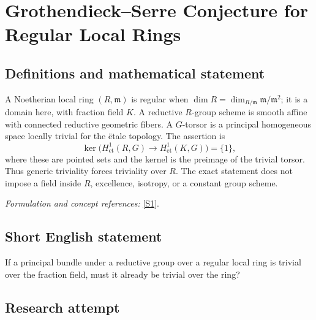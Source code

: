 \documentclass[11pt,a4paper]{article}
\newcommand{\sref}[2]{\hyperlink{source:#1:#2}{[S#2]}}
\newif\ifshowcatalogue
\newcommand{\cataloguescope}[1]{\ifshowcatalogue
 \paragraph{Exact scope in the supplied catalogue.}
 \begin{quote}\small #1\end{quote}\fi}
\numberwithin{equation}{section}
\begin{document}
\setcounter{section}{0}
\clearpage
\section*{\texorpdfstring{Grothendieck–Serre Conjecture for Regular Local Rings}{Grothendieck–Serre Conjecture for Regular Local Rings}}\label{30002360}
\subsection{Definitions and mathematical statement}
A Noetherian local ring $(R,\mathfrak m)$ is regular when
$\dim R=\dim_{R/\mathfrak m}\mathfrak m/\mathfrak m^2$; it is a domain here, with fraction field $K$. A reductive $R$-group scheme is smooth affine with connected reductive geometric fibers. A $G$-torsor is a principal homogeneous space locally trivial for the \"etale topology. The assertion is
\[
 \ker\bigl(H^1_{\mathrm{et}}(R,G)\to H^1_{\mathrm{et}}(K,G)\bigr)=\{1\},
\]
where these are pointed sets and the kernel is the preimage of the trivial torsor. Thus generic triviality forces triviality over $R$. The exact statement does not impose a field inside $R$, excellence, isotropy, or a constant group scheme.
\par\smallskip\textit{Formulation and concept references:} \sref{30002360}{1}.
\cataloguescope{For every commutative Noetherian regular local ring R, with fraction field K=Frac(R), and every reductive R-group scheme G (smooth affine with connected reductive geometric fibers), every G-torsor over Spec(R) that becomes trivial over Spec(K) is already trivial over Spec(R). Equivalently, the natural map of nonabelian pointed sets H\textasciicircum{}1\_et(R,G) -> H\textasciicircum{}1\_et(K,G) has trivial kernel. Regular local rings here are domains. No field-containing, excellence, finite-type, unramified, quasi-split, isotropic or constant-group restriction is imposed.}
\subsection{Short English statement}
If a principal bundle under a reductive group over a regular local ring is trivial over the fraction field, must it already be trivial over the ring?
\subsection{Research attempt}
\end{document}
